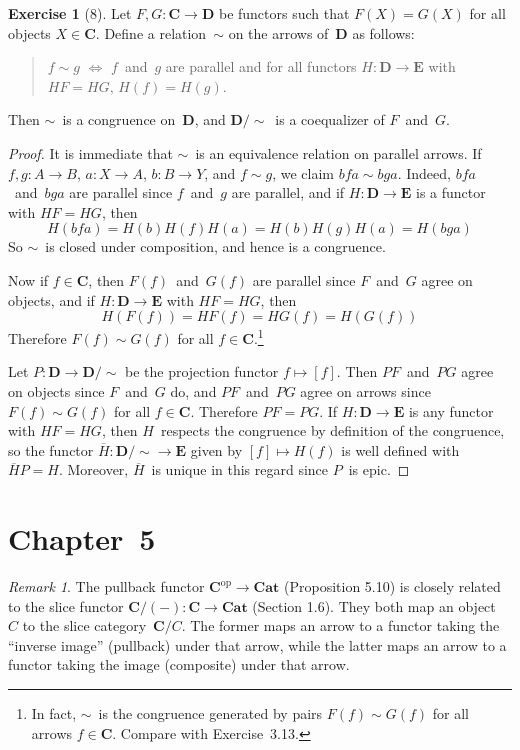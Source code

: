 \documentclass[letterpaper,12pt]{article}
\newcommand{\eq}{\sim}
\newcommand{\cat}[1]{\mathbf{#1}}
\newcommand{\dual}[1]{#1^{\mathrm{op}}}
\newcommand{\2}{\cat{2}}
\newcommand{\C}{\cat{C}}
\newcommand{\Cop}{\dual{\C}}
\newcommand{\D}{\cat{D}}
\newcommand{\E}{\cat{E}}
\newcommand{\Cat}{\cat{Cat}}
\theoremstyle{definition}
\newtheorem*{exer}{Exercise}
\theoremstyle{remark}
\newtheorem*{rmk}{Remark}
\theoremstyle{direction}
\begin{document}
\begin{exer}[8]
Let \(F,G:\C\to\D\) be functors such that \(F(X)=G(X)\) for all objects \(X\in\C\). Define a relation~\(\eq\) on the arrows of~\(\D\) as follows:
\begin{quote}
\(f\eq g\) \(\iff\) \(f\)~and~\(g\) are parallel and for all functors \(H:\D\to\E\) with \(HF=HG\), \(H(f)=H(g)\).
\end{quote}
Then \(\eq\)~is a congruence on~\(\D\), and \(\D/{\eq}\)~is a coequalizer of \(F\)~and~\(G\).
\end{exer}
\begin{proof}
It is immediate that \(\eq\)~is an equivalence relation on parallel arrows. If \(f,g:A\to B\), \(a:X\to A\), \(b:B\to Y\), and \(f\eq g\), we claim \(bfa\eq bga\). Indeed, \(bfa\)~and~\(bga\) are parallel since \(f\)~and~\(g\) are parallel, and if \(H:\D\to\E\) is a functor with \(HF=HG\), then
\[H(bfa)=H(b)H(f)H(a)=H(b)H(g)H(a)=H(bga)\]
So \(\eq\)~is closed under composition, and hence is a congruence.

Now if \(f\in\C\), then \(F(f)\)~and~\(G(f)\) are parallel since \(F\)~and~\(G\) agree on objects, and if \(H:\D\to\E\) with \(HF=HG\), then
\[H(F(f))=HF(f)=HG(f)=H(G(f))\]
Therefore \(F(f)\eq G(f)\) for all \(f\in\C\).\footnote{In fact, \(\eq\)~is the congruence generated by pairs \(F(f)\eq G(f)\) for all arrows \(f\in\C\). Compare with Exercise~3.13.}

Let \(P:\D\to\D/{\eq}\) be the projection functor \(f\mapsto[f]\). Then \(PF\)~and~\(PG\) agree on objects since \(F\)~and~\(G\) do, and \(PF\)~and~\(PG\) agree on arrows since \(F(f)\eq G(f)\) for all \(f\in\C\). Therefore \(PF=PG\). If \(H:\D\to\E\) is any functor with \(HF=HG\), then \(H\)~respects the congruence by definition of the congruence, so the functor \(\overline{H}:\D/{\eq}\to\E\) given by \([f]\mapsto H(f)\) is well defined with \(\overline{H}P=H\). Moreover, \(\overline{H}\)~is unique in this regard since \(P\)~is epic.
\end{proof}

\section*{Chapter~5}
\begin{rmk}
The pullback functor \(\Cop\to\Cat\) (Proposition 5.10) is closely related to the slice functor \(\C/(-):\C\to\Cat\) (Section 1.6). They both map an object~\(C\) to the slice category~\(\C/C\). The former maps an arrow to a functor taking the ``inverse image'' (pullback) under that arrow, while the latter maps an arrow to a functor taking the image (composite) under that arrow.
\end{rmk}
\end{document}
